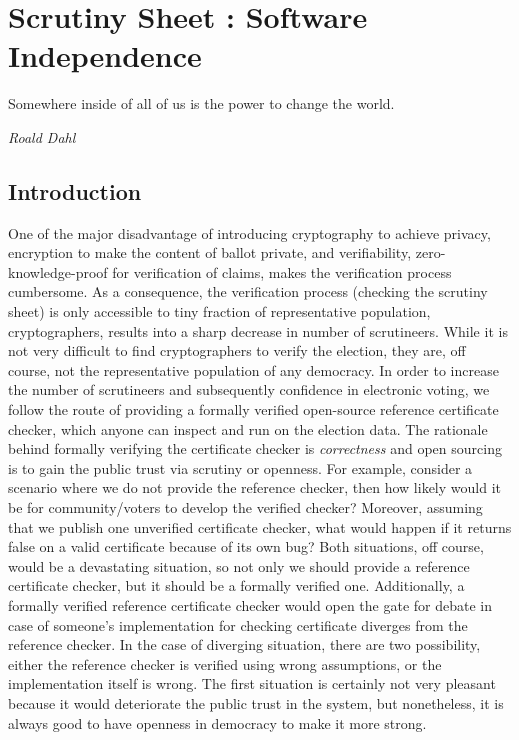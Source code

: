 	\chapter{Scrutiny Sheet : Software Independence}
\label{cha:software_independence}

\epigraph{Somewhere inside of all of us is the power to change the world.} 
{\textit{Roald Dahl }}

\section{Introduction}


One of the major disadvantage of introducing cryptography 
to achieve privacy, encryption to make the 
content of ballot private,  and verifiability, zero-knowledge-proof for verification of claims, makes the verification 
process cumbersome. As a consequence, the verification process (checking the scrutiny sheet) is only accessible 
to tiny fraction of representative population, cryptographers, results into a sharp decrease in number of scrutineers. 
While it is not very difficult to find cryptographers to verify the election, 
they are, off course, not the representative population of any democracy. 
In order to increase the number of scrutineers and subsequently confidence in electronic voting, we follow the 
route of providing a formally verified open-source 
reference certificate checker, which anyone can inspect and run on the election data. 
  The rationale behind formally verifying the certificate checker is \emph{correctness}
  and open sourcing is to gain the public trust  via scrutiny or openness.  
  For example, consider a scenario where we do not provide the reference checker,
  then how 
  likely would it be for community/voters to develop the 
  verified checker? Moreover, assuming that we publish one unverified certificate checker,
  what would happen if it returns false on a valid certificate because of its own bug? 
  Both situations, off course, would be a devastating situation, so not only we 
  should provide a reference certificate checker, but it should be a formally verified one. 
  Additionally, a formally verified reference certificate checker would open the gate for
  debate in case of someone's implementation for checking certificate diverges from the reference checker.
In the case of diverging situation, there are two possibility, either the reference checker is verified 
using wrong assumptions,  or the implementation itself is wrong.  The first situation is certainly 
not very pleasant because it would deteriorate the public trust in the system, but nonetheless, it is always
good to  have openness in democracy to make it more strong. 
  
